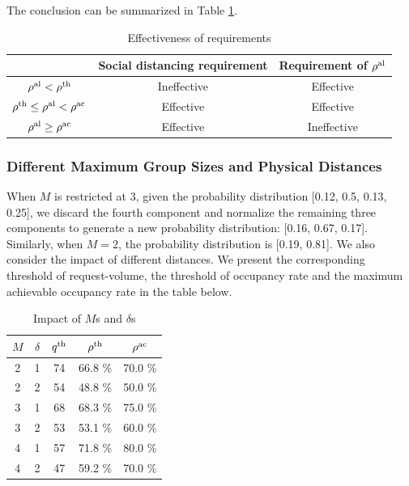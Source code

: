 The conclusion can be summarized in Table \ref{tab_requirement}.
\begin{table}[ht]
  \centering
  \caption{Effectiveness of requirements}\label{tab_requirement}
  \begin{tabular}{ccc}
  \hline
  \hline
   & Social distancing requirement & Requirement of $\rho^{\textup{al}}$ \\
  \hline
  $\rho^{\textup{al}} < \rho^{\textup{th}}$            & Ineffective & Effective \\
  $\rho^{\textup{th}} \leq \rho^{\textup{al}} < \rho^{\textup{ac}}$  & Effective   & Effective \\
  $\rho^{\textup{al}} \geq \rho^{\textup{ac}}$                  & Effective   & Ineffective \\
   \hline
   \hline
  \end{tabular}
\end{table}


\subsubsection{Different Maximum Group Sizes and Physical Distances}
When $M$ is restricted at 3, given the probability distribution [0.12, 0.5, 0.13, 0.25], we discard the fourth component and normalize the remaining three components to generate a new probability distribution: [0.16, 0.67, 0.17]. Similarly, when $M =2$, the probability distribution is [0.19, 0.81].
We also consider the impact of different distances. We present the corresponding threshold of request-volume, the threshold of occupancy rate and the maximum achievable occupancy rate in the table below.

\begin{table}[ht]
  \centering
  \caption{Impact of $M$s and $\delta$s}
  \begin{tabular}{ccccc}
  \hline
  \hline
   $M$  & $\delta$ & $q^{\textup{th}}$ & $\rho^{\textup{th}}$ & $\rho^{\textup{ac}}$ \\
  \hline
   2 & 1 & 74  & 66.8 \% & 70.0 \% \\
   2 & 2 & 54  & 48.8 \% & 50.0 \% \\ 
   3 & 1 & 68  & 68.3 \% & 75.0 \% \\
   3 & 2 & 53  & 53.1 \% & 60.0 \% \\
   4 & 1 & 57  & 71.8 \% & 80.0 \% \\
   4 & 2 & 47  & 59.2 \% & 70.0 \% \\
   \hline
   \hline
  \end{tabular}
\end{table}


